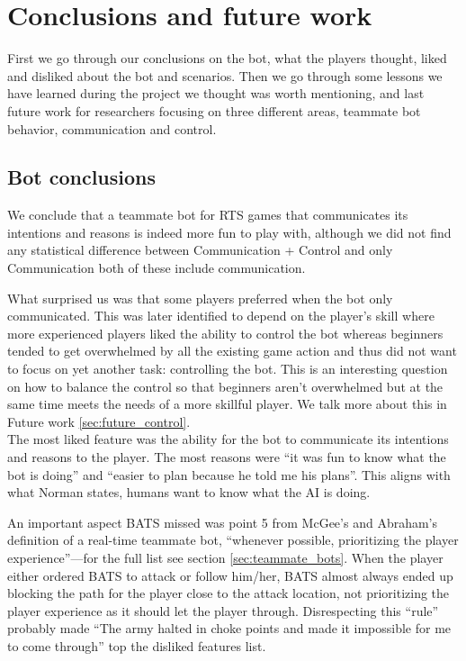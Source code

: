 \chapter{Conclusions and future work}
First we go through our conclusions on the bot, what the players thought, liked and disliked about
the bot and scenarios. Then we go through some lessons we have learned during the project we thought
was worth mentioning, and last future work for researchers focusing on three different areas,
teammate bot behavior, communication and control.

\section{Bot conclusions}
We conclude that a teammate bot for RTS games that communicates its intentions and reasons is indeed
more fun to play with, although we did not find any statistical difference between Communication +
Control and only Communication both of these include communication.

What surprised us was that some players
preferred when the bot only communicated. This was later identified to depend on the player's skill
where more experienced players liked the ability to control the bot whereas beginners tended to get
overwhelmed by all the existing game action and thus did not want to focus on yet another task:
controlling the bot. This is an interesting question on how to balance the control so that
beginners aren't overwhelmed but at the same time meets the needs of a more skillful player. We talk
more about this in Future work \ref{sec:future_control}.\\


The most liked feature was the ability for the bot to communicate its intentions and reasons to the
player. The most reasons were ``it was fun to know what the bot is doing'' and ``easier to plan
because he told me his plans''. This aligns with what Norman states, humans want to know what the AI
is doing\cite{norman07}.

An important aspect BATS missed was point 5 from McGee's and Abraham's definition\cite{mcgee10} of a
real-time teammate bot, ``whenever possible, prioritizing the player experience''—for the full list
see section \ref{sec:teammate_bots}. When the player either ordered BATS to attack or follow
him/her, BATS almost always ended up blocking the path for the player close to the attack location,
not prioritizing the player experience as it should let the player through.
Disrespecting this ``rule'' probably made ``The army halted in choke points and made it impossible
for me to come through'' top the disliked features list.

